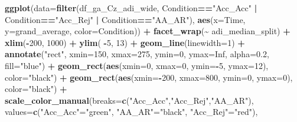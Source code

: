 \documentclass[
]{article}
\newenvironment{Shaded}{\begin{snugshade}}{\end{snugshade}}
\newcommand{\AttributeTok}[1]{\textcolor[rgb]{0.13,0.29,0.53}{#1}}
\newcommand{\ConstantTok}[1]{\textcolor[rgb]{0.56,0.35,0.01}{#1}}
\newcommand{\DecValTok}[1]{\textcolor[rgb]{0.00,0.00,0.81}{#1}}
\newcommand{\FloatTok}[1]{\textcolor[rgb]{0.00,0.00,0.81}{#1}}
\newcommand{\FunctionTok}[1]{\textcolor[rgb]{0.13,0.29,0.53}{\textbf{#1}}}
\newcommand{\NormalTok}[1]{#1}
\newcommand{\OtherTok}[1]{\textcolor[rgb]{0.56,0.35,0.01}{#1}}
\newcommand{\SpecialCharTok}[1]{\textcolor[rgb]{0.81,0.36,0.00}{\textbf{#1}}}
\newcommand{\StringTok}[1]{\textcolor[rgb]{0.31,0.60,0.02}{#1}}
\begin{document}
\begin{Shaded}
\begin{Highlighting}[]
\FunctionTok{ggplot}\NormalTok{(}\AttributeTok{data=}\FunctionTok{filter}\NormalTok{(df\_ga\_Cz\_adi\_wide, Condition}\SpecialCharTok{==}\StringTok{"Acc\_Acc"} \SpecialCharTok{|}\NormalTok{ Condition}\SpecialCharTok{==}\StringTok{"Acc\_Rej"} \SpecialCharTok{|}\NormalTok{ Condition}\SpecialCharTok{==}\StringTok{"AA\_AR"}\NormalTok{), }\FunctionTok{aes}\NormalTok{(}\AttributeTok{x=}\NormalTok{Time, }\AttributeTok{y=}\NormalTok{grand\_average, }\AttributeTok{color=}\NormalTok{Condition)) }\SpecialCharTok{+}
  \FunctionTok{facet\_wrap}\NormalTok{(}\SpecialCharTok{\textasciitilde{}}\NormalTok{ adi\_median\_split) }\SpecialCharTok{+}
  \FunctionTok{xlim}\NormalTok{(}\SpecialCharTok{{-}}\DecValTok{200}\NormalTok{, }\DecValTok{1000}\NormalTok{) }\SpecialCharTok{+}
  \FunctionTok{ylim}\NormalTok{( }\SpecialCharTok{{-}}\DecValTok{5}\NormalTok{, }\DecValTok{13}\NormalTok{) }\SpecialCharTok{+}
  \FunctionTok{geom\_line}\NormalTok{(}\AttributeTok{linewidth=}\DecValTok{1}\NormalTok{) }\SpecialCharTok{+}
  \FunctionTok{annotate}\NormalTok{(}\StringTok{"rect"}\NormalTok{, }\AttributeTok{xmin=}\DecValTok{150}\NormalTok{, }\AttributeTok{xmax=}\DecValTok{275}\NormalTok{, }\AttributeTok{ymin=}\DecValTok{0}\NormalTok{, }\AttributeTok{ymax=}\ConstantTok{Inf}\NormalTok{, }\AttributeTok{alpha=}\FloatTok{0.2}\NormalTok{, }\AttributeTok{fill=}\StringTok{"blue"}\NormalTok{) }\SpecialCharTok{+}
  \FunctionTok{geom\_rect}\NormalTok{(}\FunctionTok{aes}\NormalTok{(}\AttributeTok{xmin=}\DecValTok{0}\NormalTok{, }\AttributeTok{xmax=}\DecValTok{0}\NormalTok{, }\AttributeTok{ymin=}\SpecialCharTok{{-}}\DecValTok{5}\NormalTok{, }\AttributeTok{ymax=}\DecValTok{12}\NormalTok{), }\AttributeTok{color=}\StringTok{"black"}\NormalTok{) }\SpecialCharTok{+}
  \FunctionTok{geom\_rect}\NormalTok{(}\FunctionTok{aes}\NormalTok{(}\AttributeTok{xmin=}\SpecialCharTok{{-}}\DecValTok{200}\NormalTok{, }\AttributeTok{xmax=}\DecValTok{800}\NormalTok{, }\AttributeTok{ymin=}\DecValTok{0}\NormalTok{, }\AttributeTok{ymax=}\DecValTok{0}\NormalTok{), }\AttributeTok{color=}\StringTok{"black"}\NormalTok{) }\SpecialCharTok{+}
  \FunctionTok{scale\_color\_manual}\NormalTok{(}\AttributeTok{breaks=}\FunctionTok{c}\NormalTok{(}\StringTok{"Acc\_Acc"}\NormalTok{,}\StringTok{"Acc\_Rej"}\NormalTok{,}\StringTok{"AA\_AR"}\NormalTok{),}
                     \AttributeTok{values=}\FunctionTok{c}\NormalTok{(}\StringTok{"Acc\_Acc"}\OtherTok{=}\StringTok{"green"}\NormalTok{, }\StringTok{"AA\_AR"}\OtherTok{=}\StringTok{"black"}\NormalTok{, }\StringTok{"Acc\_Rej"}\OtherTok{=}\StringTok{"red"}\NormalTok{), }

\end{Highlighting}
\end{Shaded}
\end{document}
